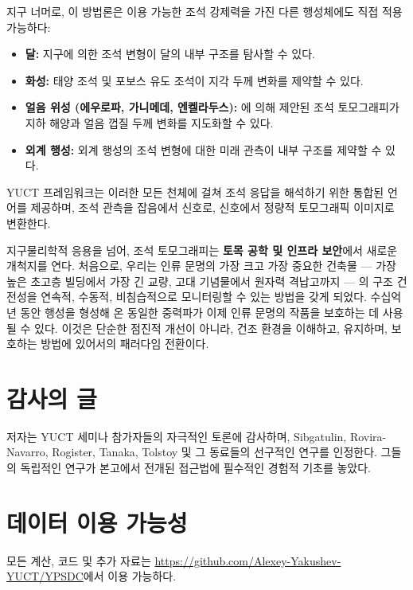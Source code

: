 \documentclass[12pt,a4paper]{article}
\theoremstyle{remark}
\begin{document}
	지구 너머로, 이 방법론은 이용 가능한 조석 강제력을 가진 다른 행성체에도 직접 적용 가능하다:
	
	\begin{itemize}
		\item \textbf{달:} 지구에 의한 조석 변형이 달의 내부 구조를 탐사할 수 있다.
		\item \textbf{화성:} 태양 조석 및 포보스 유도 조석이 지각 두께 변화를 제약할 수 있다.
		\item \textbf{얼음 위성 (에우로파, 가니메데, 엔켈라두스):} \cite{RoviraNavarro2025}에 의해 제안된 조석 토모그래피가 지하 해양과 얼음 껍질 두께 변화를 지도화할 수 있다.
		\item \textbf{외계 행성:} 외계 행성의 조석 변형에 대한 미래 관측이 내부 구조를 제약할 수 있다.
	\end{itemize}
	
	YUCT 프레임워크는 이러한 모든 천체에 걸쳐 조석 응답을 해석하기 위한 통합된 언어를 제공하며, 조석 관측을 잡음에서 신호로, 신호에서 정량적 토모그래픽 이미지로 변환한다.
	
	지구물리학적 응용을 넘어, 조석 토모그래피는 \textbf{토목 공학 및 인프라 보안}에서 새로운 개척지를 연다. 처음으로, 우리는 인류 문명의 가장 크고 가장 중요한 건축물 — 가장 높은 초고층 빌딩에서 가장 긴 교량, 고대 기념물에서 원자력 격납고까지 — 의 구조 건전성을 연속적, 수동적, 비침습적으로 모니터링할 수 있는 방법을 갖게 되었다. 수십억 년 동안 행성을 형성해 온 동일한 중력파가 이제 인류 문명의 작품을 보호하는 데 사용될 수 있다. 이것은 단순한 점진적 개선이 아니라, 건조 환경을 이해하고, 유지하며, 보호하는 방법에 있어서의 패러다임 전환이다.
	
	\section*{감사의 글}
	
	저자는 YUCT 세미나 참가자들의 자극적인 토론에 감사하며, Sibgatulin, Rovira-Navarro, Rogister, Tanaka, Tolstoy 및 그 동료들의 선구적인 연구를 인정한다. 그들의 독립적인 연구가 본고에서 전개된 접근법에 필수적인 경험적 기초를 놓았다.
	
	\section*{데이터 이용 가능성}
	
	모든 계산, 코드 및 추가 자료는 \url{https://github.com/Alexey-Yakushev-YUCT/YPSDC}에서 이용 가능하다.
	
\end{document}
